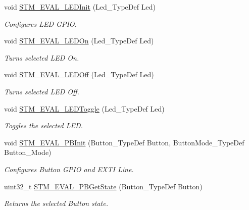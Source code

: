 \begin{DoxyCompactItemize}
\item 
void \hyperlink{group___s_t_m32_f4___d_i_s_c_o_v_e_r_y___l_o_w___l_e_v_e_l___exported___functions_ga01e1a245e786705357f741c8d42cbd3a}{S\-T\-M\-\_\-\-E\-V\-A\-L\-\_\-\-L\-E\-D\-Init} (Led\-\_\-\-Type\-Def Led)
\begin{DoxyCompactList}\small\item\em Configures L\-E\-D G\-P\-I\-O. \end{DoxyCompactList}\item 
void \hyperlink{group___s_t_m32_f4___d_i_s_c_o_v_e_r_y___l_o_w___l_e_v_e_l___exported___functions_gad27fa430d867e6dde94cb7896fcc42fc}{S\-T\-M\-\_\-\-E\-V\-A\-L\-\_\-\-L\-E\-D\-On} (Led\-\_\-\-Type\-Def Led)
\begin{DoxyCompactList}\small\item\em Turns selected L\-E\-D On. \end{DoxyCompactList}\item 
void \hyperlink{group___s_t_m32_f4___d_i_s_c_o_v_e_r_y___l_o_w___l_e_v_e_l___exported___functions_gab9ab7deafd606e72d72580ec974b7757}{S\-T\-M\-\_\-\-E\-V\-A\-L\-\_\-\-L\-E\-D\-Off} (Led\-\_\-\-Type\-Def Led)
\begin{DoxyCompactList}\small\item\em Turns selected L\-E\-D Off. \end{DoxyCompactList}\item 
void \hyperlink{group___s_t_m32_f4___d_i_s_c_o_v_e_r_y___l_o_w___l_e_v_e_l___exported___functions_ga5b1ccd57cf505c1d41440e62a845e4a9}{S\-T\-M\-\_\-\-E\-V\-A\-L\-\_\-\-L\-E\-D\-Toggle} (Led\-\_\-\-Type\-Def Led)
\begin{DoxyCompactList}\small\item\em Toggles the selected L\-E\-D. \end{DoxyCompactList}\item 
void \hyperlink{group___s_t_m32_f4___d_i_s_c_o_v_e_r_y___l_o_w___l_e_v_e_l___exported___functions_ga1cdc19fe328ddcd17bf50fcb62d78369}{S\-T\-M\-\_\-\-E\-V\-A\-L\-\_\-\-P\-B\-Init} (Button\-\_\-\-Type\-Def Button, Button\-Mode\-\_\-\-Type\-Def Button\-\_\-\-Mode)
\begin{DoxyCompactList}\small\item\em Configures Button G\-P\-I\-O and E\-X\-T\-I Line. \end{DoxyCompactList}\item 
uint32\-\_\-t \hyperlink{group___s_t_m32_f4___d_i_s_c_o_v_e_r_y___l_o_w___l_e_v_e_l___exported___functions_ga812ee2a84aaed235587ac81eb9269442}{S\-T\-M\-\_\-\-E\-V\-A\-L\-\_\-\-P\-B\-Get\-State} (Button\-\_\-\-Type\-Def Button)
\begin{DoxyCompactList}\small\item\em Returns the selected Button state. \end{DoxyCompactList}\end{DoxyCompactItemize}


